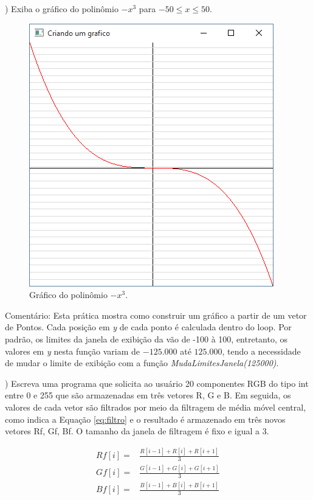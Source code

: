 \begin{renumerate}
\item)
Exiba o gráfico do polinômio $-x^3$ para $-50 \leq x \leq 50$.
  \label{ex:cap02_ex1}

  \begin{figure}[ht]
    \centerline{\includegraphics[width=.3\textwidth]{img/cap2_ex8.png}}
    \caption{Gráfico do polinômio $-x^3$.}
    \label{fig:cap02_ex1}
  \end{figure}

Comentário: Esta prática mostra como construir um gráfico a partir de um vetor de Pontos. Cada posição em \emph{y} de cada ponto é calculada dentro do loop. Por padrão, os limites da janela de exibição da \playAPC{} vão de -100 à 100, entretanto, os valores em \emph{y} nesta função variam de $-125.000$ até $125.000$, tendo a necessidade de mudar o limite de exibição com a função \emph{MudaLimitesJanela(125000)}.
%

\item)
Escreva uma programa que solicita ao usuário 20 componentes RGB do tipo int entre 0 e 255 que são armazenadas em três vetores R, G e B. Em seguida, os valores de cada vetor são filtrados por meio da filtragem de média móvel central, como indica a Equação \ref{eq:filtro} e o resultado é armazenado em três novos vetores Rf, Gf, Bf. O tamanho da janela de filtragem é fixo e igual a 3. 

  \label{ex:cap02_ex26}

\begin{equation} \label{eq:filtro}
\begin{matrix}
Rf[i] = & \frac{R[i-1] + R[i] + R[i+1]}{3}\\ 
Gf[i] = & \frac{G[i-1] + G[i] + G[i+1]}{3}\\ 
Bf[i] = & \frac{B[i-1] + B[i] + B[i+1]}{3}
\end{matrix}
\end{equation}


\end{renumerate}
